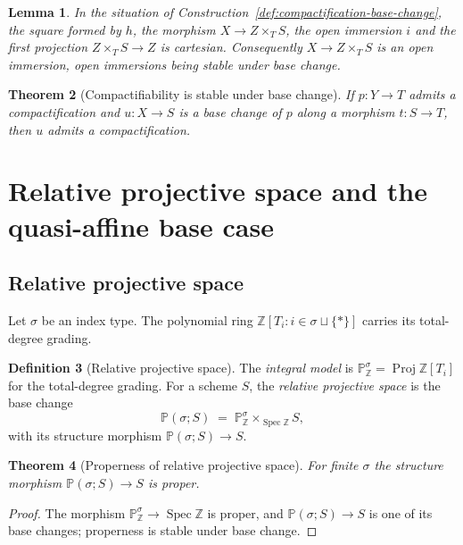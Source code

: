 \documentclass[11pt,a4paper]{article}
\theoremstyle{plain}
\newtheorem{theorem}{Theorem}[section]
\newtheorem{lemma}[theorem]{Lemma}
\theoremstyle{definition}
\newtheorem{definition}[theorem]{Definition}
\theoremstyle{remark}
\newcommand{\Spec}{\operatorname{Spec}}
\newcommand{\Proj}{\operatorname{Proj}}
\newcommand{\Pj}{\mathbb{P}}
\begin{document}
\begin{lemma}
\label{lem:base-change-square}
In the situation of Construction~\ref{def:compactification-base-change}, the
square formed by $h$, the morphism $X\to Z\times_T S$, the open immersion $i$
and the first projection $Z\times_T S\to Z$ is cartesian. Consequently
$X\to Z\times_T S$ is an open immersion, open immersions being stable under
base change.
\end{lemma}

\begin{theorem}[Compactifiability is stable under base change]
\label{thm:base-change}
If $p\colon Y\to T$ admits a compactification and $u\colon X\to S$ is a base
change of $p$ along a morphism $t\colon S\to T$, then $u$ admits a
compactification.
\end{theorem}

\section{Relative projective space and the quasi-affine base case}
\label{sec:projective}

\subsection{Relative projective space}

Let $\sigma$ be an index type. The polynomial ring
$\mathbb{Z}[T_i : i\in\sigma\sqcup\{*\}]$ carries its total-degree grading.

\begin{definition}[Relative projective space]
\label{def:relative-projective-space}
The \emph{integral model} is $\Pj^{\sigma}_{\mathbb{Z}}
=\Proj \mathbb{Z}[T_i]$ for the total-degree grading. For a scheme $S$, the
\emph{relative projective space} is the base change
\[
  \Pj(\sigma;S) \;=\; \Pj^{\sigma}_{\mathbb{Z}}\times_{\Spec\mathbb{Z}} S ,
\]
with its structure morphism $\Pj(\sigma;S)\to S$.
\end{definition}

\begin{theorem}[Properness of relative projective space]
\label{thm:proj-proper}
For finite $\sigma$ the structure morphism $\Pj(\sigma;S)\to S$ is proper.
\end{theorem}

\begin{proof}
The morphism $\Pj^{\sigma}_{\mathbb{Z}}\to\Spec\mathbb{Z}$ is proper, and
$\Pj(\sigma;S)\to S$ is one of its base changes; properness is stable under
base change.
\end{proof}
\end{document}

